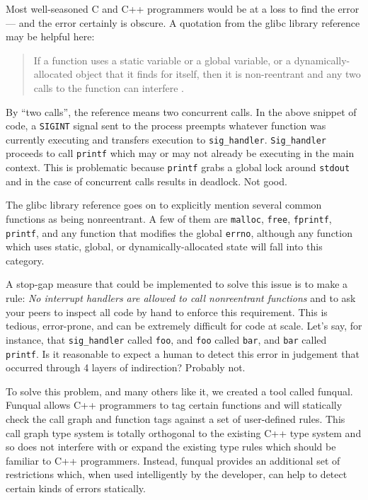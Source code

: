 Most well-seasoned C and C++ programmers would be at a loss to find the error --- and the error certainly is obscure.  A quotation from the glibc library reference may be helpful here:

\begin{quote}
    If a function uses a static variable or a global variable, or a dynamically-allocated object that it finds for itself, then it is non-reentrant and any two calls to the function can interfere \cite{gnu-manual}.
\end{quote}

By ``two calls'', the reference means two concurrent calls.  In the above snippet of code, a \lstinline{SIGINT} signal sent to the process preempts whatever function was currently executing and transfers execution to \lstinline{sig_handler}.  \lstinline{Sig_handler} proceeds to call \lstinline{printf} which may or may not already be executing in the main context.  This is problematic because \lstinline{printf} grabs a global lock around \lstinline{stdout} and in the case of concurrent calls results in deadlock.  Not good.

The glibc library reference goes on to explicitly mention several common functions as being nonreentrant.  A few of them are \lstinline{malloc}, \lstinline{free}, \lstinline{fprintf}, \lstinline{printf}, and any function that modifies the global \lstinline{errno}, although any function which uses static, global, or dynamically-allocated state will fall into this category.  

A stop-gap measure that could be implemented to solve this issue is to make a rule: \textit{No interrupt handlers are allowed to call nonreentrant functions} and to ask your peers to inspect all code by hand to enforce this requirement.  This is tedious, error-prone, and can be extremely difficult for code at scale.  Let's say, for instance, that \lstinline{sig_handler} called \lstinline{foo}, and \lstinline{foo} called \lstinline{bar}, and \lstinline{bar} called \lstinline{printf}.  Is it reasonable to expect a human to detect this error in judgement that occurred through 4 layers of indirection?  Probably not.

To solve this problem, and many others like it, we created a tool called funqual.  Funqual allows C++ programmers to tag certain functions and will statically check the call graph and function tags against a set of user-defined rules.  This call graph type system is totally orthogonal to the existing C++ type system and so does not interfere with or expand the existing type rules which should be familiar to C++ programmers.  Instead, funqual provides an additional set of restrictions which, when used intelligently by the developer, can help to detect certain kinds of errors statically.

